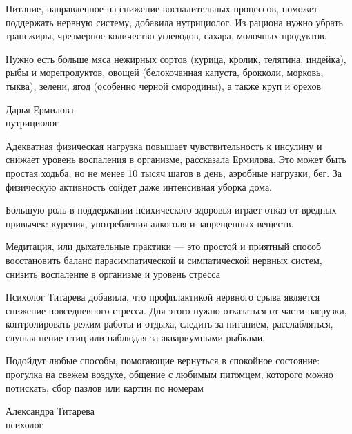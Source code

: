 Питание, направленное на снижение воспалительных процессов, поможет поддержать нервную систему, добавила нутрициолог. Из рациона нужно убрать трансжиры, чрезмерное количество углеводов, сахара, молочных продуктов.

\begin{fancyquotes}
    Нужно есть больше мяса нежирных сортов (курица, кролик, телятина, индейка), рыбы и морепродуктов, овощей (белокочанная капуста, брокколи, морковь, тыква), зелени, ягод (особенно черной смородины), а также круп и орехов\\

    \begin{flushright}
        Дарья Ермилова\\
        нутрициолог
    \end{flushright}
\end{fancyquotes}

Адекватная физическая нагрузка повышает чувствительность к инсулину и снижает уровень воспаления в организме, рассказала Ермилова. Это может быть простая ходьба, но не менее 10 тысяч шагов в день, аэробные нагрузки, бег. За физическую активность сойдет даже интенсивная уборка дома.

Большую роль в поддержании психического здоровья играет отказ от вредных привычек: курения, употребления алкоголя и запрещенных веществ.

\begin{framed}
    \begin{center}
        \Large

        Медитация, или дыхательные практики  ---  это простой и приятный способ восстановить баланс парасимпатической и симпатической нервных систем, снизить воспаление в организме и уровень стресса
    \end{center}
\end{framed}

Психолог Титарева добавила, что профилактикой нервного срыва является снижение повседневного стресса. Для этого нужно отказаться от части нагрузки, контролировать режим работы и отдыха, следить за питанием, расслабляться, слушая пение птиц или наблюдая за аквариумными рыбками.

\begin{fancyquotes}
    Подойдут любые способы, помогающие вернуться в спокойное состояние: прогулка на свежем воздухе, общение с любимым питомцем, которого можно потискать, сбор пазлов или картин по номерам\\

    \begin{flushright}
        Александра Титарева\\
        психолог
    \end{flushright}

\end{fancyquotes}


